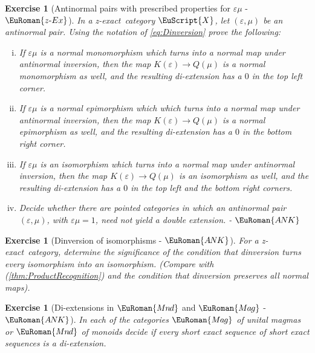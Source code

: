 \documentclass [12pt,oneside]{book}%
\theoremstyle{captionstyle}  %
\newtheorem{exercise}[theorem]{Exercise}
\newenvironment{thmlist}{		%
	\begin{enumerate}[(i)]}{
	\end{enumerate}
}
\newenvironment{exercises}{%
	\def\FrameCommand{{\color{Maroon}\vrule width 0pt}\hspace{0pt}\fboxsep=\FrameSep}%
	\MakeFramed{\hsize=0.95\linewidth\advance\hsize-\width\FrameRestore%
		\bigskip
		\textbf{Exercises}\vspace{-2ex}\footnotesize{
		}}
}
{\endMakeFramed}
\newcommand{\hy}{\text{-}}													%
\newcommand{\IdMap}{1}												%
\newcommand{\Magmas}{\EuRoman{M{\kern -.12ex}a{\kern -.15ex}g}}			%
\newcommand{\Monoids}{\EuRoman{M{\kern -.12ex}n{\kern -.15ex}d}}			%
\newcommand{\ZeroObject}{0}                           %
\newcommand{\Ctgry}[1]{\EuScript{#1}}					%
\newcommand{\ZExact}{z-exact}									%
\newcommand{\Ker}[1]{\textit{K}(#1)}		     	%
\newcommand{\CoKer}[1]{\textit{Q}(#1)}               %
\newcommand{\ANKTag}{ - $\EuRoman{A{\kern-0.2ex}N{\kern-0.15ex}K}$}								%
\newcommand{\ZExactTag}{ - {\color{Cerulean} $\EuRoman{z\hy Ex}$}}
\begin{document}
\begin{exercises}
\begin{exercise}[Antinormal pairs with prescribed properties for $\varepsilon\mu$\ZExactTag]
    \label{exe:AntinormalPairs-emPrescribedProps}%
    In a \ZExact\ category $\Ctgry{X}$, let $(\varepsilon,\mu)$ be an antinormal pair. Using the notation of \eqref{eq:Dinversion} prove the following:
    \begin{thmlist}
        \item If $\varepsilon\mu$ is a normal monomorphism which turns into a normal map under antinormal inversion, then the map $\Ker{\varepsilon}\to \CoKer{\mu}$ is a normal monomorphism as well, and the resulting di-extension has a $\ZeroObject$ in the top left corner.
        \item If $\varepsilon\mu$ is a normal epimorphism which which turns into a normal map under antinormal inversion, then the map $\Ker{\varepsilon}\to \CoKer{\mu}$ is a normal epimorphism as well, and the resulting di-extension has a $\ZeroObject$ in the bottom right corner.
        \item If $\varepsilon\mu$ is an isomorphism which turns into a normal map under antinormal inversion, then the map $\Ker{\varepsilon}\to \CoKer{\mu}$ is an isomorphism as well, and the resulting di-extension has a $\ZeroObject$ in the top left and the bottom right corners.
        \item Decide whether there are pointed categories in which an antinormal pair $(\varepsilon,\mu)$, with $\varepsilon\mu=\IdMap$, need not yield a double extension. \ANKTag
    \end{thmlist}
\end{exercise}

\begin{exercise}[Dinversion of isomorphisms\ANKTag]
    \label{exe:DinversionOfIso}
    For a \ZExact\ category, determine the significance of the condition that dinversion turns every isomorphism into an isomorphism. (Compare with (\ref{thm:ProductRecognition}) and the condition that dinversion preserves all normal maps).
\end{exercise}

\begin{exercise}[Di-extensions in $\Monoids$ and $\Magmas$\ANKTag]
    \label{exe:DoubleExt-Mon/Mag}
    In each of the categories $\Magmas$ of unital magmas or $\Monoids$ of monoids decide if every short exact sequence of short exact sequences is a di-extension.
\end{exercise}


\end{exercises}
\end{document}
